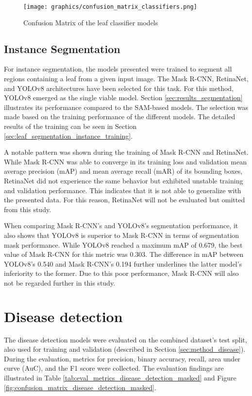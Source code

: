 \documentclass[draft,final]{vutinfth} %
\begin{document}
\begin{figure}
    \centering
    \texttt{[image: graphics/confusion\_matrix\_classifiers.png]}
    \caption{Confusion Matrix of the leaf classifier models}
    \label{fig:panoptic_classification_conf_matrix}
\end{figure}

\subsection{Instance Segmentation} \label{sec:results_segmentation_instance}
For instance segmentation, the models presented were trained to segment all regions containing a leaf from a given input image. The Mask R-CNN, RetinaNet, and YOLOv8 architectures have been selected for this task.
For this method, YOLOv8 emerged as the single viable model. Section \ref{sec:results_segmentation} illustrates its performance compared to the SAM-based models.
The selection was made based on the training performance of the different models. The detailed results of the training can be seen in Section \ref{sec:leaf_segmentation_instance_training}. 

A notable pattern was shown during the training of Mask R-CNN and RetinaNet. While Mask R-CNN was able to converge in its training loss and validation mean average precision (mAP) and mean average recall (mAR) of its bounding boxes, RetinaNet did not experience the same behavior but exhibited unstable training and validation performance. This indicates that it is not able to generalize with the presented data. For this reason, RetinaNet will not be evaluated but omitted from this study. 

When comparing Mask R-CNN's and YOLOv8's segmentation performance, it also shows that YOLOv8 is superior to Mask R-CNN in terms of segmentation mask performance. While YOLOv8 reached a maximum mAP of 0.679, the best value of Mask R-CNN for this metric was 0.303. The difference in mAP between YOLOv8's 0.540 and Mask R-CNN's 0.194 further underlines the latter model's inferiority to the former. Due to this poor performance, Mask R-CNN will also not be regarded further in this study.

\section{Disease detection} \label{sec:results_disease}
The disease detection models were evaluated on the combined dataset's test split, also used for training and validation (described in Section \ref{sec:method_disease}). During the evaluation, metrics for precision, binary accuracy, recall, area under curve (AuC), and the F1 score were collected. The evaluation findings are illustrated in Table \ref{tab:eval_metrics_disease_detection_masked} and Figure \ref{fig:confusion_matrix_disease_detection_masked}.
\end{document}
